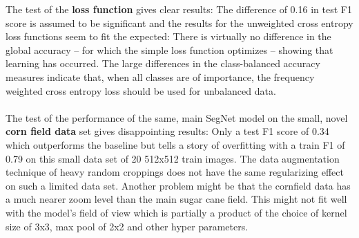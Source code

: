 \documentclass{article}
\begin{document}
\noindent
The test of the \textbf{loss function} gives clear results: The difference of 0.16 in test F1 score is assumed to be significant and the results for the unweighted cross entropy loss functions seem to fit the expected:
There is virtually no difference in the global accuracy -- for which the simple loss function optimizes -- showing that learning has occurred.
The large differences in the class-balanced accuracy measures indicate that, when all classes are of importance, the frequency weighted cross entropy loss should be used  for unbalanced data.
\\
\\
The test of the performance of the same, main SegNet model on the small, novel \textbf{corn field data} set gives disappointing results: Only a test F1 score of 0.34 which outperforms the baseline but tells a story of overfitting with a train F1 of 0.79 on this small data set of 20 512x512 train images.
 The data augmentation technique of heavy random croppings does not have the same regularizing effect on such a limited data set. 
Another problem might be that the cornfield data has a much nearer zoom level than the main sugar cane field.
This might not fit well with the model's field of view which is partially a product of the choice of kernel size of 3x3, max pool of 2x2 and other hyper parameters.

\label{sec:foot}
\end{document}
